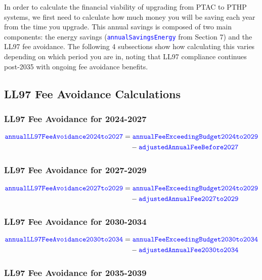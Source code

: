 \documentclass{article}
\newcommand{\code}[1]{\textcolor{blue}{\texttt{#1}}}
\begin{document}
In order to calculate the financial viability of upgrading from PTAC to PTHP systems, we first need to calculate how much money you will be saving each year from the time you upgrade. This annual savings is composed of two main components: the energy savings (\code{annualSavingsEnergy} from Section 7) and the LL97 fee avoidance. The following 4 subsections show how calculating this varies depending on which period you are in, noting that LL97 compliance continues post-2035 with ongoing fee avoidance benefits.

\subsection{LL97 Fee Avoidance Calculations}

\subsubsection{LL97 Fee Avoidance for 2024-2027}

\begin{align}
\code{annualLL97FeeAvoidance2024to2027} &= \code{annualFeeExceedingBudget2024to2029} \nonumber\\
&\quad - \code{adjustedAnnualFeeBefore2027}
\end{align}

\subsubsection{LL97 Fee Avoidance for 2027-2029}

\begin{align}
\code{annualLL97FeeAvoidance2027to2029} &= \code{annualFeeExceedingBudget2024to2029} \nonumber \\
&\quad - \code{adjustedAnnualFee2027to2029}
\end{align}

\subsubsection{LL97 Fee Avoidance for 2030-2034}

\begin{align}
\code{annualLL97FeeAvoidance2030to2034} &= \code{annualFeeExceedingBudget2030to2034} \nonumber \\
&\quad - \code{adjustedAnnualFee2030to2034}
\end{align}

\subsubsection{LL97 Fee Avoidance for 2035-2039}
\end{document}
